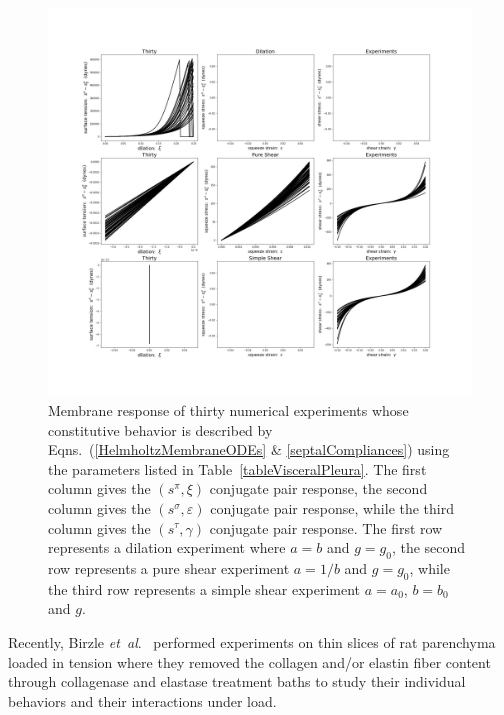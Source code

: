 \begin{figure}
    \mbox{} \hspace{-25mm}
    \includegraphics[width=1.3\textwidth]{figures/septalMembranes.jpg}
    \caption{Membrane response of thirty numerical experiments whose constitutive behavior is described by Eqns.~(\ref{HelmholtzMembraneODEs} \& \ref{septalCompliances}) using the parameters listed in Table~\ref{tableVisceralPleura}. The first column gives the $( s^{\pi} \! , \xi)$ conjugate pair response, the second column gives the $( s^{\sigma} \! , \varepsilon)$ conjugate pair response, while the third column gives the $( s^{\tau} \! , \gamma)$ conjugate pair response.  The first row represents a dilation experiment where $a = b$ and $g = g_0$, the second row represents a pure shear experiment $a = 1/b$ and $g=g_0$, while the third row represents a simple shear experiment $a=a_0$, $b=b_0$ and $g$.}
    \label{figStressStrainMembranes}
\end{figure}

Recently, Birzle \textit{et~al}.\ \cite{Birzleetal19} performed experiments on thin slices of rat parenchyma loaded in tension where they removed the collagen and\slash or elastin fiber content through collagenase and elastase treatment baths to study their individual behaviors and their interactions under load.
